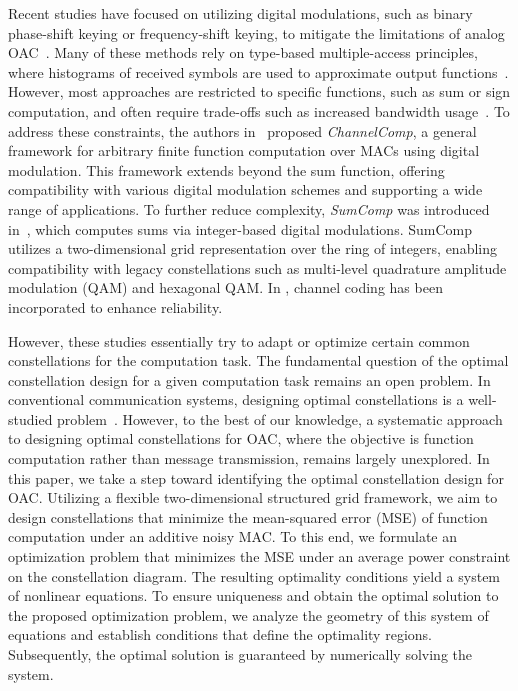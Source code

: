 \documentclass[journal,12pt,onecolumn,draftclsnofoot]{IEEEtran}
\theoremstyle{definition}
\begin{document}
Recent studies have focused on utilizing digital modulations, such as binary phase-shift keying or frequency-shift keying, to mitigate the limitations of analog OAC~\cite{zhu2020one,csahin2023distributed,csahin2023over,csahin2024over,qiao2024massive}. Many of these methods rely on type-based multiple-access principles, where histograms of received symbols are used to approximate output functions~\cite{mergen2006type,perez2025waveforms,qiao2024massive}. However, most approaches are restricted to specific functions, such as sum or sign computation, and often require trade-offs such as increased bandwidth usage~\cite{csahin2023over}. To address these constraints, the authors in~\cite{saeed2023ChannelComp,razavi2025revisit,razavi2025revisitII} proposed \textit{ChannelComp}, a general framework for arbitrary finite function computation over MACs using digital modulation. This framework extends beyond the sum function, offering compatibility with various digital modulation schemes and supporting a wide range of applications. To further reduce complexity, \textit{SumComp} was introduced in~\cite{Razavikia2024Ring}, which computes sums via integer-based digital modulations. SumComp utilizes a two-dimensional grid representation over the ring of integers, enabling compatibility with legacy constellations such as multi-level quadrature amplitude modulation (QAM) and hexagonal QAM. In \cite{liu2025digital,xie2023joint,yan2025remac}, channel coding has been incorporated to enhance reliability.






However, these studies essentially try to adapt or optimize certain common constellations for the computation task. The fundamental question of the optimal constellation design for a given computation task remains an open problem. In conventional communication systems, designing optimal constellations is a well-studied problem~\cite{forney1998modulation,makowski2006optimality,zhang2019constellation}. However, to the best of our knowledge, a systematic approach to designing optimal constellations for OAC, where the objective is function computation rather than message transmission, remains largely unexplored.  In this paper, we take a step toward identifying the optimal constellation design for OAC. Utilizing a flexible two-dimensional structured grid framework, we aim to design constellations that minimize the mean-squared error (MSE) of function computation under an additive noisy MAC. To this end, we formulate an optimization problem that minimizes the MSE under an average power constraint on the constellation diagram. The resulting optimality conditions yield a system of nonlinear equations. To ensure uniqueness and obtain the optimal solution to the proposed optimization problem, we analyze the geometry of this system of equations and establish conditions that define the optimality regions. Subsequently, the optimal solution is guaranteed by numerically solving the system.
\end{document}
